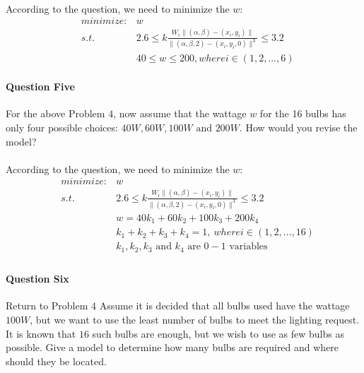 \documentclass[11pt]{article}
\begin{document}
\paragraph{\color{red}{Answer:}}
  According to the question, we need to minimize the $w$: \\
\begin{align*}
  &minimize: &w  \\
  &s.t.      &2.6 \leq k\frac{W_i \parallel(\alpha,\beta) - (x_i, y_i)\parallel}{\parallel(\alpha,\beta,2) - (x_i, y_i,0)\parallel^3} \leq 3.2 \\
  &          &40 \leq w \leq 200, where i \in (1,2,\dots,6)
\end{align*}

\paragraph{Question Five}
  For the above Problem $4$, now assume that the wattage $w$ for the 16 bulbs
  has only four possible choices: $40W,60W,100W \text{ and } 200W$. How would
  you revise the model?

\paragraph{\color{red}{Answer:}}
  According to the question, we need to minimize the $w$: \\
\begin{align*}
  &minimize:  &w  \\
  &s.t.       &2.6 \leq k\frac{W_i \parallel(\alpha,\beta) - (x_i, y_i)\parallel}{\parallel(\alpha,\beta,2) - (x_i, y_i,0)\parallel^3} \leq 3.2 \\
  &           &w = 40k_1 + 60k_2 + 100k_3 + 200k_4 \\
  &           &k_1 + k_2 + k_3 + k_4 =1, \ where i \in (1,2,\dots,16)\\
  &           &\text{$k_1, k_2, k_3$ and $k_4$ are $0 - 1$ variables} \\
\end{align*}

\paragraph{Question Six}
  Return to Problem $4$ Assume it is decided that all bulbs used have the wattage
  $100W$, but we want to use the least number of bulbs to meet the lighting request.
  It is known that $16$ such bulbs are enough, but we wish to use as few bulbs as
  possible. Give a model to determine how many bulbs are required and where
  should they be located.
\end{document}
